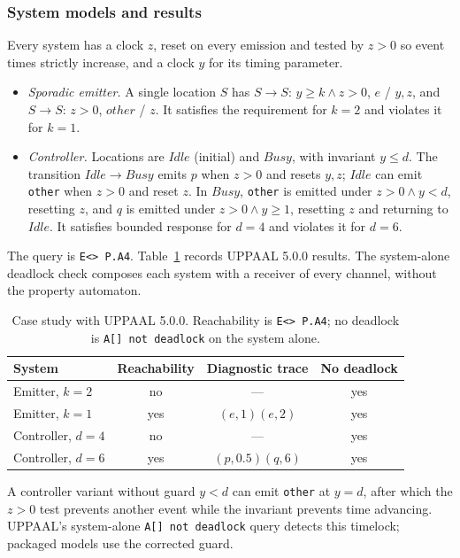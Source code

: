 \subsubsection{System models and results}
Every system has a clock $z$, reset on every emission and tested by $z>0$ so event times strictly increase, and a clock $y$ for its timing parameter.
\begin{itemize}[leftmargin=*,itemsep=0pt]
\item \emph{Sporadic emitter.} A single location $S$ has $S\to S$: $y\ge k\land z>0$, $e$ / $y,z$, and $S\to S$: $z>0$, $\mathit{other}$ / $z$. It satisfies the requirement for $k=2$ and violates it for $k=1$.
\item \emph{Controller.} Locations are $\mathit{Idle}$ (initial) and $\mathit{Busy}$, with invariant $y\le d$. The transition $\mathit{Idle}\to\mathit{Busy}$ emits $p$ when $z>0$ and resets $y,z$; $\mathit{Idle}$ can emit \texttt{other} when $z>0$ and reset $z$. In $\mathit{Busy}$, \texttt{other} is emitted under $z>0\land y<d$, resetting $z$, and $q$ is emitted under $z>0\land y\ge1$, resetting $z$ and returning to $\mathit{Idle}$. It satisfies bounded response for $d=4$ and violates it for $d=6$.
\end{itemize}
The query is \texttt{E<> P.A4}. Table~\ref{tab:case} records UPPAAL 5.0.0 results. The system-alone deadlock check composes each system with a receiver of every channel, without the property automaton.
\begin{table}[t]
\centering
\caption{Case study with UPPAAL 5.0.0. Reachability is \texttt{E<> P.A4}; no deadlock is \texttt{A[] not deadlock} on the system alone.}
\label{tab:case}
\footnotesize
\begin{tabular}{@{}lccc@{}}
\toprule
System & Reachability & Diagnostic trace & No deadlock\\
\midrule
Emitter, $k=2$ & no & --- & yes\\
Emitter, $k=1$ & yes & $(e,1)(e,2)$ & yes\\
Controller, $d=4$ & no & --- & yes\\
Controller, $d=6$ & yes & $(p,0.5)(q,6)$ & yes\\
\bottomrule
\end{tabular}
\end{table}
A controller variant without guard $y<d$ can emit \texttt{other} at $y=d$, after which the $z>0$ test prevents another event while the invariant prevents time advancing. UPPAAL's system-alone \texttt{A[] not deadlock} query detects this timelock; packaged models use the corrected guard.

